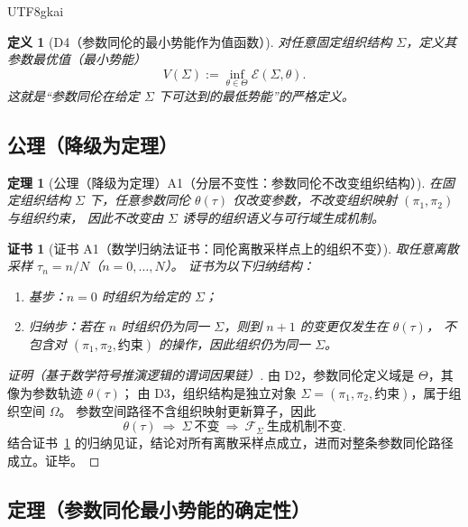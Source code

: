 \documentclass[12pt]{article}
\newtheorem{definition}{定义}[section]
\newtheorem{theorem}{定理}[section]
\newtheorem{Certificate}{证书}[section]
\begin{document}
\begin{CJK*}{UTF8}{gkai}
\begin{definition}[D4（参数同伦的最小势能作为值函数）]
\label{def:tex28-ch7-d4}
对任意固定组织结构 $\Sigma$，定义其参数最优值（最小势能）
\[
  V(\Sigma):=\inf_{\theta\in\Theta}\mathcal{E}(\Sigma,\theta).
\]
这就是“参数同伦在给定 $\Sigma$ 下可达到的最低势能”的严格定义。
\end{definition}

\subsection{公理（降级为定理）}
\label{subsec:tex28-ch7-axioms}

\begin{theorem}[公理（降级为定理）A1（分层不变性：参数同伦不改变组织结构）]
\label{thm:tex28-ch7-a1}
在固定组织结构 $\Sigma$ 下，任意参数同伦 $\theta(\tau)$ 仅改变参数，不改变组织映射 $(\pi_1,\pi_2)$ 与组织约束，
因此不改变由 $\Sigma$ 诱导的组织语义与可行域生成机制。
\end{theorem}

\begin{Certificate}[证书 A1（数学归纳法证书：同伦离散采样点上的组织不变）]
\label{cert:tex28-ch7-a1}
取任意离散采样 $\tau_n=n/N$（$n=0,\dots,N$）。
证书为以下归纳结构：
\begin{enumerate}
  \item 基步：$n=0$ 时组织为给定的 $\Sigma$；
  \item 归纳步：若在 $n$ 时组织仍为同一 $\Sigma$，则到 $n+1$ 的变更仅发生在 $\theta(\tau)$，
  不包含对 $(\pi_1,\pi_2,\text{约束})$ 的操作，因此组织仍为同一 $\Sigma$。
\end{enumerate}
\end{Certificate}

\begin{proof}[证明（基于数学符号推演逻辑的谓词因果链）]
由 D2，参数同伦定义域是 $\Theta$，其像为参数轨迹 $\theta(\tau)$；
由 D3，组织结构是独立对象 $\Sigma=(\pi_1,\pi_2,\text{约束})$，属于组织空间 $\Omega$。
参数空间路径不含组织映射更新算子，因此
\[
  \theta(\tau)\ \Rightarrow\ \Sigma\ \text{不变}\ \Rightarrow\ \mathcal{F}_{\Sigma}\ \text{生成机制不变}.
\]
结合证书~\ref{cert:tex28-ch7-a1} 的归纳见证，结论对所有离散采样点成立，进而对整条参数同伦路径成立。证毕。
\end{proof}

\subsection{定理（参数同伦最小势能的确定性）}
\label{subsec:tex28-ch7-theorems}


\end{CJK*}
\end{document}
